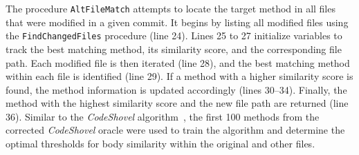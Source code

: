 The procedure \texttt{AltFileMatch} attempts to locate the target method in all files that were modified in a given commit. It begins by listing all modified files using the \texttt{FindChangedFiles} procedure (line 24). Lines 25 to 27 initialize variables to track the best matching method, its similarity score, and the corresponding file path. Each modified file is then iterated (line 28), and the best matching method within each file is identified (line 29). If a method with a higher similarity score is found, the method information is updated accordingly (lines 30–34). Finally, the method with the highest similarity score and the new file path are returned (line 36). Similar to the \textit{CodeShovel} algorithm~\cite{grund_codeshovel_2021}, the first 100 methods from the corrected \textit{CodeShovel} oracle were used to train the algorithm and determine the optimal thresholds for body similarity within the original and other files.
